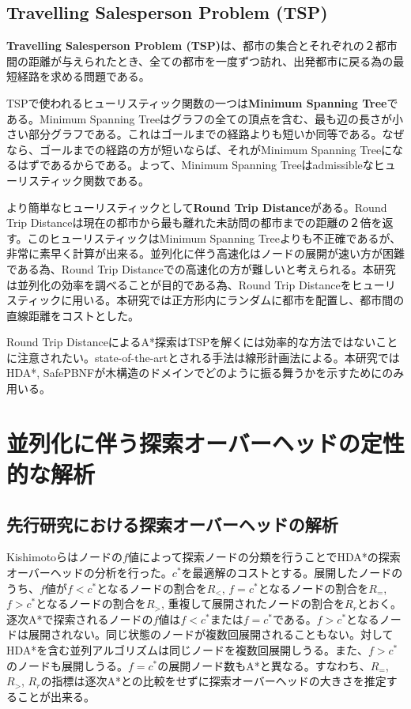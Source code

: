 \documentclass[uplatex]{jsarticle}
\begin{document}
\subsection{Travelling Salesperson Problem (TSP)}
\textbf{Travelling Salesperson Problem (TSP)}は、都市の集合とそれぞれの２都市間の距離が与えられたとき、全ての都市を一度ずつ訪れ、出発都市に戻る為の最短経路を求める問題である。

TSPで使われるヒューリスティック関数の一つは\textbf{Minimum Spanning Tree}である。Minimum Spanning Treeはグラフの全ての頂点を含む、最も辺の長さが小さい部分グラフである。これはゴールまでの経路よりも短いか同等である。なぜなら、ゴールまでの経路の方が短いならば、それがMinimum Spanning Treeになるはずであるからである。よって、Minimum Spanning Treeはadmissibleなヒューリスティック関数である。

より簡単なヒューリスティックとして\textbf{Round Trip Distance}がある。Round Trip Distanceは現在の都市から最も離れた未訪問の都市までの距離の２倍を返す。このヒューリスティックはMinimum Spanning Treeよりも不正確であるが、非常に素早く計算が出来る。並列化に伴う高速化はノードの展開が速い方が困難である為、Round Trip Distanceでの高速化の方が難しいと考えられる。本研究は並列化の効率を調べることが目的である為、Round Trip Distanceをヒューリスティックに用いる。本研究では正方形内にランダムに都市を配置し、都市間の直線距離をコストとした。

Round Trip DistanceによるA*探索はTSPを解くには効率的な方法ではないことに注意されたい。state-of-the-artとされる手法は線形計画法による\cite{applegate2006traveling}。本研究ではHDA*, SafePBNFが木構造のドメインでどのように振る舞うかを示すためにのみ用いる。

\newpage

\section{並列化に伴う探索オーバーヘッドの定性的な解析}
\label{sec:analysis1}

\subsection{先行研究における探索オーバーヘッドの解析}
Kishimotoらはノードの$f$値によって探索ノードの分類を行うことでHDA*の探索オーバーヘッドの分析を行った\cite{Kishimoto2013}。$c^*$を最適解のコストとする。展開したノードのうち、$f$値が$f < c^*$となるノードの割合を$R_{<}$, $f = c^*$となるノードの割合を$R_{=}$, $f > c^*$となるノードの割合を$R_{>}$, 重複して展開されたノードの割合を$R_{r}$とおく。逐次A*で探索されるノードの$f$値は$f < c^*$または$f = c^*$である。$f > c^*$となるノードは展開されない。同じ状態のノードが複数回展開されることもない。対してHDA*を含む並列アルゴリズムは同じノードを複数回展開しうる。また、$f > c^*$のノードも展開しうる。$f = c^*$の展開ノード数もA*と異なる。すなわち、$R_{=}$, $R_{>}$, $R_{r}$の指標は逐次A*との比較をせずに探索オーバーヘッドの大きさを推定することが出来る。
\end{document}

